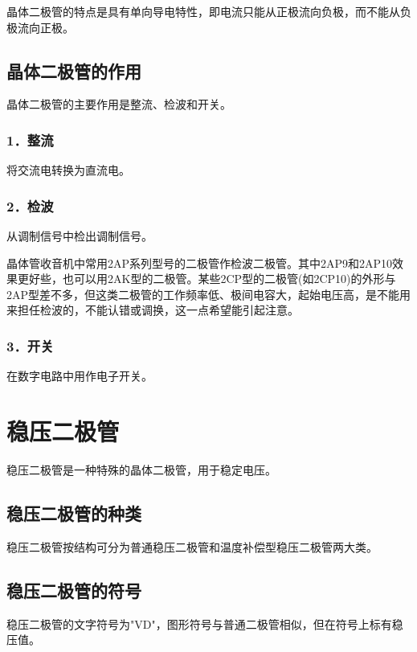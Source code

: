 \documentclass[12pt,UTF8]{ctexbook}
\begin{document}
晶体二极管的特点是具有单向导电特性，即电流只能从正极流向负极，而不能从负极流向正极。

\subsection{晶体二极管的作用}

晶体二极管的主要作用是整流、检波和开关。

\subsubsection{1．整流}

将交流电转换为直流电。

\subsubsection{2．检波}

从调制信号中检出调制信号。

晶体管收音机中常用2AP系列型号的二极管作检波二极管。其中2AP9和2AP10效果更好些，也可以用2AK型的二极管。某些2CP型的二极管(如2CP10)的外形与2AP型差不多，但这类二极管的工作频率低、极间电容大，起始电压高，是不能用来担任检波的，不能认错或调换，这一点希望能引起注意。

\subsubsection{3．开关}

在数字电路中用作电子开关。

\section{稳压二极管}

稳压二极管是一种特殊的晶体二极管，用于稳定电压。

\subsection{稳压二极管的种类}

稳压二极管按结构可分为普通稳压二极管和温度补偿型稳压二极管两大类。

\subsection{稳压二极管的符号}

稳压二极管的文字符号为"VD"，图形符号与普通二极管相似，但在符号上标有稳压值。
\end{document}
